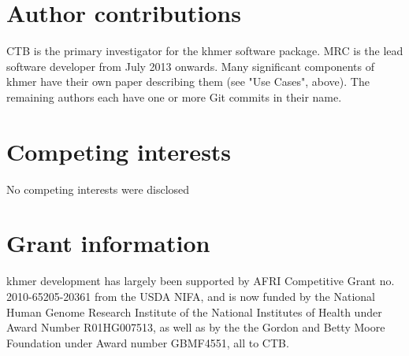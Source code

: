 \documentclass[10pt,a4paper]{article}
\begin{document}
\section*{Author contributions}
CTB is the primary investigator for the khmer software package. MRC is the lead software developer from July 2013 onwards. Many significant components of khmer have their own paper describing them (see "Use Cases", above). The remaining authors each have one or more Git commits in their name.

\section*{Competing interests}
No competing interests were disclosed

\section*{Grant information}

khmer development has largely been supported by AFRI Competitive Grant
no. 2010-65205-20361 from the USDA NIFA, and is now funded by the
National Human Genome Research Institute of the National Institutes of
Health under Award Number R01HG007513, as well as by the the Gordon and Betty Moore Foundation under Award number GBMF4551, all to CTB.

\end{document}

